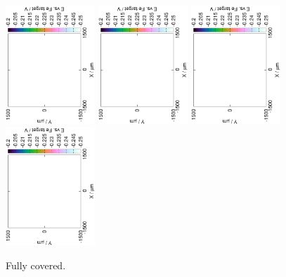 \documentclass[3p]{elsarticle}
\begin{document}
\begin{figure}[H]
\includegraphics[trim = 20mm 30mm 0mm 20mm, clip, width=0.3\textwidth, angle=-90]{18011705.eps} 
\includegraphics[trim = 20mm 30mm 0mm 20mm, clip, width=0.3\textwidth, angle=-90]{18011706.eps} 
\includegraphics[trim = 20mm 30mm 0mm 20mm, clip, width=0.3\textwidth, angle=-90]{18011707.eps} 
\includegraphics[trim = 20mm 30mm 0mm 20mm, clip, width=0.3\textwidth, angle=-90]{18011708.eps}
\caption{Fully covered.}
\label{fig:deconvolution}
\end{figure}
\end{document}
